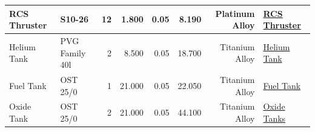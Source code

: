 \begin{table}[h]
{\begin{tabular}{|l|l|r|r|r|r|r|l|}
\hline
RCS Thruster                                                   & S10-26                                                   & 12                                                       & 1.800                                                                                             & 0.05                                 & 8.190                                                                                          & Platinum Alloy           & \href{https://www.space-propulsion.com/spacecraft-propulsion/bipropellant-thrusters/10-bipropellant-thrusters.html}{RCS Thruster}                                                                                                                 \\ 
\hline
Helium Tank                                                    & PVG Family 40l                                           & 2                                                        & 8.500                                                                                             & 0.05                                 & 18.700                                                                                         & Titanium Alloy           & \href{https://www.mt-aerospace.de/files/mta/tankkatalog/MT-Tankkatalog.pdf}{Helium Tank}                                                                                                                                                       \\ 
\hline
Fuel Tank                                                      & OST 25/0                                                 & 1                                                        & 21.000                                                                                            & 0.05                                 & 22.050                                                                                         & Titanium Alloy           & \href{https://www.space-propulsion.com/spacecraft-propulsion/bipropellant-tanks/index.html\#198}{Fuel Tank}                                                                                                                                   \\ 
\hline
Oxide Tank                                                     & OST 25/0                                                 & 2                                                        & 21.000                                                                                            & 0.05                                 & 44.100                                                                                         & Titanium Alloy           & \href{https://www.space-propulsion.com/spacecraft-propulsion/bipropellant-tanks/index.html\#198}{Oxide Tanks}                                                                                                                                  \\ 

\end{tabular}}
\end{table}
